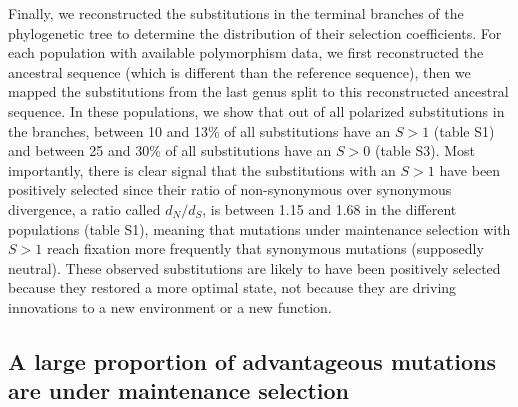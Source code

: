 \documentclass{article}
\newcommand{\dn}{d_N}
\newcommand{\ds}{d_S}
\newcommand{\dnds}{\dn / \ds}
\newcommand{\Sphy}{S}
\begin{document}
    Finally, we reconstructed the substitutions in the terminal branches of the phylogenetic tree to determine the distribution of their selection coefficients.
    For each population with available polymorphism data, we first reconstructed the ancestral sequence (which is different than the reference sequence), then we mapped the substitutions from the last genus split to this reconstructed ancestral sequence.
    In these populations, we show that out of all polarized substitutions in the branches, between 10 and 13\% of all substitutions have an $\Sphy > 1$ (table S1) and between 25 and 30\% of all substitutions have an $\Sphy > 0$ (table S3).
    Most importantly, there is clear signal that the substitutions with an $\Sphy > 1$ have been positively selected since their ratio of non-synonymous over synonymous divergence, a ratio called $\dnds$, is between 1.15 and 1.68 in the different populations (table S1), meaning that mutations under maintenance selection with $\Sphy > 1$ reach fixation more frequently that synonymous mutations (supposedly neutral).
    These observed substitutions are likely to have been positively selected because they restored a more optimal state, not because they are driving innovations to a new environment or a new function.

    \subsection*{A large proportion of advantageous mutations are under maintenance selection}
\end{document}

